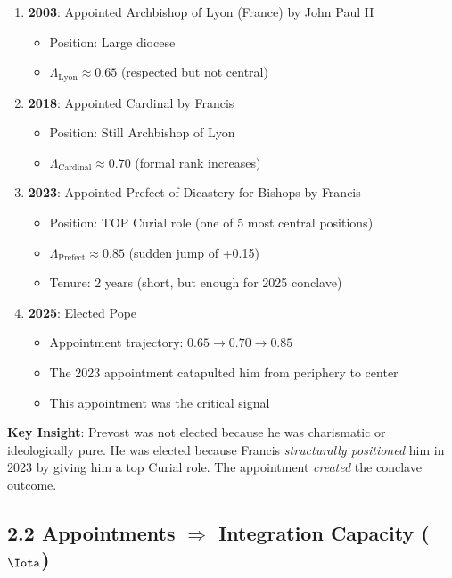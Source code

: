 \begin{enumerate}
\item \textbf{2003}: Appointed Archbishop of Lyon (France) by John Paul II
	\begin{itemize}
	\item Position: Large diocese
	\item $\Lambda_{\text{Lyon}} \approx 0.65$ (respected but not central)
	\end{itemize}

\item \textbf{2018}: Appointed Cardinal by Francis
	\begin{itemize}
	\item Position: Still Archbishop of Lyon
	\item $\Lambda_{\text{Cardinal}} \approx 0.70$ (formal rank increases)
	\end{itemize}

\item \textbf{2023}: Appointed Prefect of Dicastery for Bishops by Francis
	\begin{itemize}
	\item Position: TOP Curial role (one of 5 most central positions)
	\item $\Lambda_{\text{Prefect}} \approx 0.85$ (sudden jump of +0.15)
	\item Tenure: 2 years (short, but enough for 2025 conclave)
	\end{itemize}

\item \textbf{2025}: Elected Pope
	\begin{itemize}
	\item Appointment trajectory: $0.65 \to 0.70 \to 0.85$
	\item The 2023 appointment catapulted him from periphery to center
	\item This appointment was the critical signal
	\end{itemize}
\end{enumerate}

\textbf{Key Insight}: Prevost was not elected because he was charismatic or ideologically pure. He was elected because Francis \textit{structurally positioned} him in 2023 by giving him a top Curial role. The appointment \textit{created} the conclave outcome.

\subsection{2.2 Appointments $\Rightarrow$ Integration Capacity ($\Iota$)}

